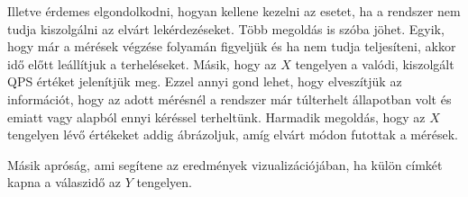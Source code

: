 Illetve érdemes elgondolkodni, hogyan kellene kezelni az esetet, ha a rendszer nem tudja kiszolgálni az elvárt lekérdezéseket. Több megoldás is szóba jöhet. Egyik, hogy már a mérések végzése folyamán figyeljük és ha nem tudja teljesíteni, akkor idő előtt leállítjuk a terheléseket. Másik, hogy az $X$ tengelyen a valódi, kiszolgált QPS értéket jelenítjük meg. Ezzel annyi gond lehet, hogy elveszítjük az információt, hogy az adott mérésnél a rendszer már túlterhelt állapotban volt és emiatt vagy alapból ennyi kéréssel terheltünk. Harmadik megoldás, hogy az $X$ tengelyen lévő értékeket addig ábrázoljuk, amíg elvárt módon futottak a mérések.

Másik apróság, ami segítene az eredmények vizualizációjában, ha külön címkét kapna a válaszidő az $Y$ tengelyen.  